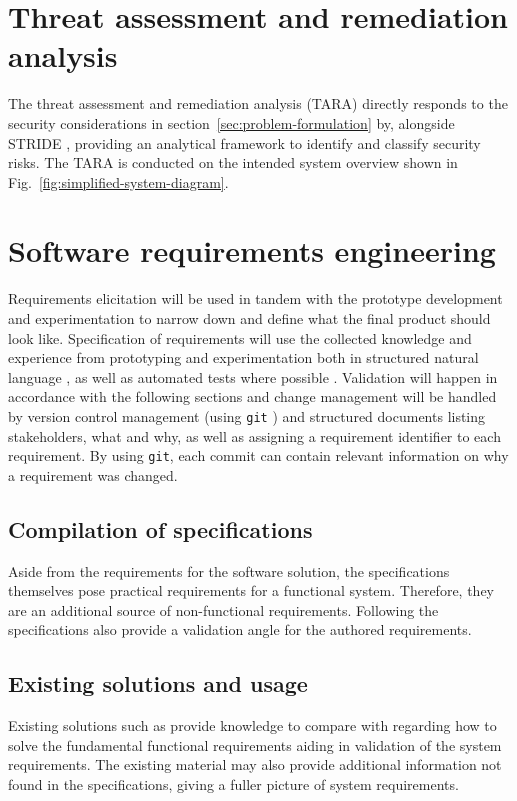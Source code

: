 \section{Threat assessment and remediation analysis}
\label{sec:tara}

The threat assessment and remediation analysis (TARA) \cite{tara}
directly responds to the security considerations in
section~\ref{sec:problem-formulation} by, alongside STRIDE
\cite{stride}, providing an analytical framework to identify and
classify security risks. The TARA is conducted on the intended
system overview shown in Fig.~\ref{fig:simplified-system-diagram}.

\section{Software requirements engineering}
\label{sec:software-requirements-engineering}

Requirements elicitation will be used in tandem with the prototype
development and experimentation to narrow down and define what the
final product should look like. Specification of requirements will
use the collected knowledge and experience from prototyping and
experimentation both in structured natural language
\cite[121]{sommerville-software-engineering}, as well as automated
tests where possible \cite{test-cases-as-requirements}. Validation
will happen in accordance with the following sections and change
management will be handled by version control management (using
\verb|git| \cite{git}) and structured documents listing
stakeholders, what and why, as well as assigning a requirement
identifier to each requirement. By using \verb|git|, each commit
can contain relevant information on why a requirement was changed.

\subsection{Compilation of specifications}

Aside from the requirements for the software solution, the
specifications \cite{etsi-ts-102-221, etsi-ts-131-102} themselves
pose practical requirements for a functional system. Therefore,
they are an additional source of non-functional requirements.
Following the specifications also provide a validation angle for
the authored requirements.

\subsection{Existing solutions and usage}

Existing solutions such as \cite{osmocom-remsim} provide knowledge
to compare with regarding how to solve the fundamental functional
requirements aiding in validation of the system requirements. The
existing material may also provide additional information not found
in the specifications, giving a fuller picture of system
requirements.
